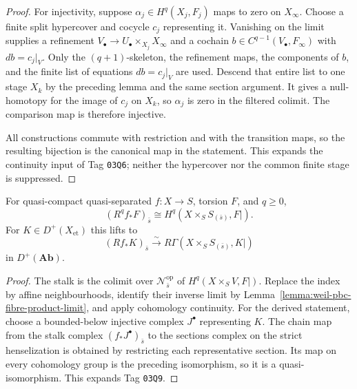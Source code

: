 \begin{proof}
For injectivity, suppose $\alpha_j\in H^q(X_j,F_j)$ maps to zero on
$X_\infty$.  Choose a finite split hypercover and cocycle $c_j$ representing
it.  Vanishing on the limit supplies a refinement
$V_\bullet\to U_\bullet\times_{X_j}X_\infty$ and a cochain
$b\in C^{q-1}(V_\bullet,F_\infty)$ with $db=c_j|_V$.  Only the
$(q+1)$-skeleton, the refinement maps, the components of $b$, and the finite
list of equations $db=c_j|_V$ are used.  Descend that entire list to one
stage $X_k$ by the preceding lemma and the same section argument.  It gives a
null-homotopy for the image of $c_j$ on $X_k$, so $\alpha_j$ is zero in the
filtered colimit.  The comparison map is therefore injective.

All constructions commute with restriction and with the transition maps,
so the resulting bijection is the canonical map in the statement.  This
expands the continuity input of Tag \texttt{03Q6}; neither the hypercover nor
the common finite stage is suppressed.
\end{proof}

\begin{proposition}
\label{prop:weil-pbc-strict-henselization-stalk-formula}
For quasi-compact quasi-separated $f:X\to S$, torsion $F$, and $q\geq0$,
\[
 (R^qf_*F)_{\bar s}\cong
 H^q(X\times_SS_{(\bar s)},F|).
\]
For $K\in D^+(X_{\mathrm{et}})$ this lifts to
\[
 (Rf_*K)_{\bar s}\xrightarrow{\sim}
 R\Gamma(X\times_SS_{(\bar s)},K|)
\]
in $D^+(\mathbf{Ab})$.
\end{proposition}
\begin{proof}

The stalk is the colimit over $\mathcal N_{\bar s}^{\mathrm{op}}$ of
$H^q(X\times_SV,F|)$.  Replace the index by affine neighbourhoods, identify
their inverse limit by Lemma~\ref{lemma:weil-pbc-fibre-product-limit}, and
apply cohomology continuity.  For the derived statement, choose a
bounded-below injective complex $J^\bullet$ representing $K$.  The chain map
from the stalk complex $(f_*J^\bullet)_{\bar s}$ to the sections complex on
the strict henselization is obtained by restricting each representative
section.  Its map on every cohomology group is the preceding isomorphism, so
it is a quasi-isomorphism.  This expands Tag \texttt{03Q9}.
\end{proof}

